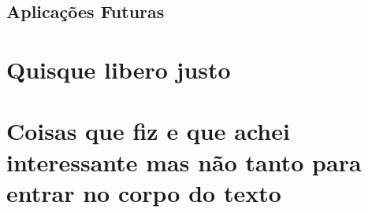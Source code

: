 \documentclass[12pt, %
openright, 
oneside, %
a4paper,    %
brazil]{facom-ufu-abntex2}
\begin{document}
\section{Aplicações Futuras}





\postextual






\begin{apendicesenv}

\partapendices

\chapter{Quisque libero justo}

\lipsum[50]

\chapter{Coisas que fiz e que achei interessante mas não tanto para entrar no corpo do texto}
\lipsum[55-57]

\end{apendicesenv}


\end{document}
